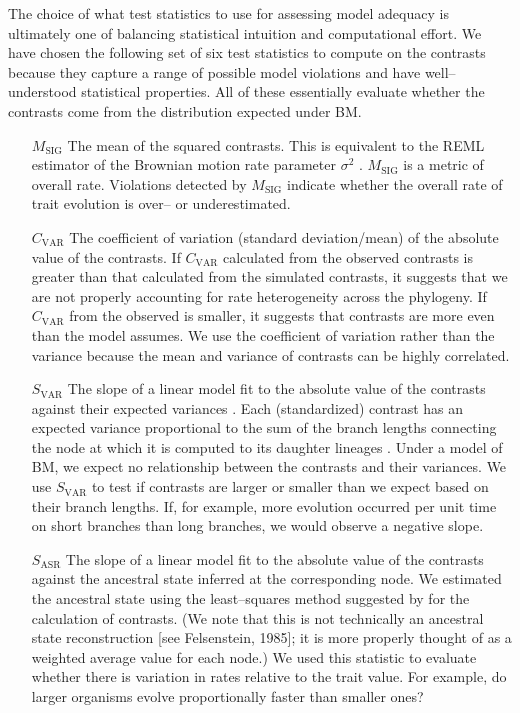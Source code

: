\documentclass[a4paper,11pt]{article}
\begin{document}
The choice of what test statistics to use for assessing model adequacy is ultimately one of balancing statistical intuition and computational effort. We have chosen the following set of six test statistics to compute on the contrasts because they capture a range of possible model violations and have well--understood statistical properties. All of these essentially evaluate whether the contrasts come from the distribution expected under BM. 

\begin{enumerate}
\item[$M_{\text{SIG}}$] The mean of the squared contrasts. This is equivalent to the REML estimator of the Brownian motion rate parameter $\sigma^2$ \citep{Garland1992, Rohlf2001}. $M_{\text{SIG}}$ is a metric of overall rate. Violations detected by $M_{\text{SIG}}$ indicate whether the overall rate of trait evolution is over-- or underestimated.

\item[$C_{\text{VAR}}$] The coefficient of variation (standard deviation/mean) of the absolute value of the contrasts. If $C_{\text{VAR}}$ calculated from the observed contrasts is greater than that calculated from the simulated contrasts, it suggests that we are not properly accounting for rate heterogeneity across the phylogeny. If $C_{\text{VAR}}$ from the observed is smaller, it suggests that contrasts are more even than the model assumes. We use the coefficient of variation rather than the variance because the mean and variance of contrasts can be highly correlated.

\item[$S_{\text{VAR}}$] The slope of a linear model fit to the absolute value of the contrasts against their expected variances \citep[following][]{Garland1992}. Each (standardized) contrast has an expected variance proportional to the sum of the branch lengths connecting the node at which it is computed to its daughter lineages  \citep{Felsenstein1985}. Under a model of BM, we expect no relationship between the contrasts and their variances. We use $S_{\text{VAR}}$ to test if contrasts are larger or smaller than we expect based on their branch lengths. If, for example, more evolution occurred per unit time on short branches than long branches, we would observe a negative slope.

\item[$S_{\text{ASR}}$] The slope of a linear model fit to the absolute value of the contrasts against the ancestral state inferred at the corresponding node. We estimated the ancestral state using the least--squares method suggested by \citet{Felsenstein1985} for the calculation of contrasts. (We note that this is not technically an ancestral state reconstruction [see Felsenstein, 1985]; it is more properly thought of as a weighted average value for each node.) We used this statistic to evaluate whether there is variation in rates relative to the trait value. For example, do larger organisms evolve proportionally faster than smaller ones?


\end{enumerate}
\end{document}
